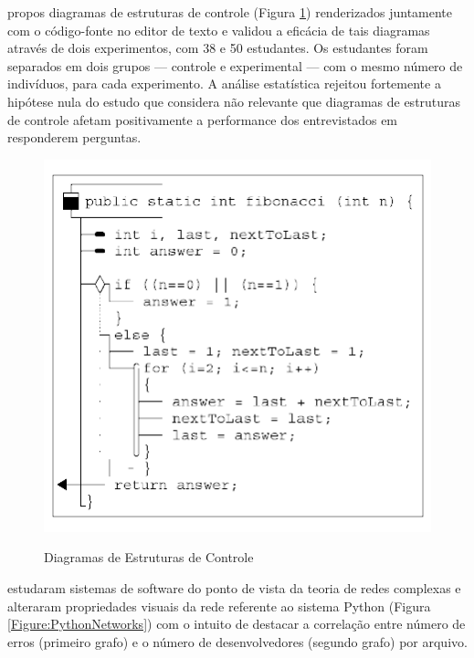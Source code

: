  propos diagramas de
estruturas de controle (Figura \ref{Figure:ControlStructureDiagram})
renderizados juntamente com o código-fonte no editor de texto e validou a
eficácia de tais diagramas através de dois experimentos, com 38 e 50 estudantes.
Os estudantes foram separados em dois grupos --- controle e experimental --- com
o mesmo número de indivíduos, para cada experimento.
A análise estatística rejeitou fortemente a hipótese nula do estudo que
considera não relevante que diagramas de estruturas de controle afetam
positivamente a performance dos entrevistados em responderem perguntas.

\begin{figure}[!htb]
    \centering
    \caption{Diagramas de Estruturas de Controle}
    \includegraphics[scale=1.4]{../shared files/figures/2.02....related...work/control structure diagram.pdf}
    \label{Figure:ControlStructureDiagram}
\end{figure}

 estudaram sistemas de software do ponto de vista da 
teoria de redes complexas e alteraram propriedades visuais da rede referente ao
sistema Python (Figura \ref{Figure:PythonNetworks}) com o intuito de destacar a
correlação entre número de erros (primeiro grafo) e o número de desenvolvedores
(segundo grafo) por arquivo.

